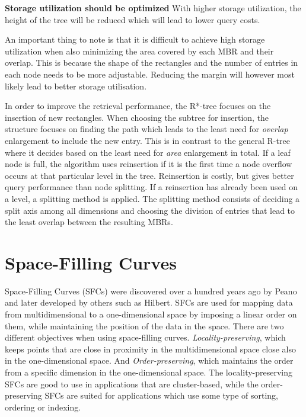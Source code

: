 \noindent
\textbf{Storage utilization should be optimized}\newline
With higher storage utilization, the height of the tree will be reduced which will lead to lower query costs. \newline

\noindent
An important thing to note is that it is difficult to achieve high storage utilization when also minimizing the area covered by each MBR and their overlap. This is because the shape of the rectangles and the number of entries in each node needs to be more adjustable. Reducing the margin will however most likely lead to better storage utilisation. \newline

\noindent
In order to improve the retrieval performance, the R*-tree focuses on the insertion of new rectangles. When choosing the subtree for insertion, the structure focuses on finding the path which leads to the least need for \emph{overlap} enlargement to include the new entry. This is in contrast to the general R-tree where it decides based on the least need for \emph{area} enlargement in total. If a leaf node is full, the algorithm uses reinsertion if it is the first time a node overflow occurs at that particular level in the tree. Reinsertion is costly, but gives better query performance than node splitting. If a reinsertion has already been used on a level, a splitting method is applied. The splitting method consists of deciding a split axis among all dimensions and choosing the division of entries that lead to the least overlap between the resulting MBRs.

\section{Space-Filling Curves}
Space-Filling Curves (SFCs) were discovered over a hundred years ago by Peano\cite{peano} and  later developed by others such as Hilbert\cite{hilbert}. SFCs are used for mapping data from multidimensional to a one-dimensional space by imposing a linear order on them, while maintaining the position of the data in the space. There are two different objectives when using space-filling curves\cite{IrregularSpace}. \emph{Locality-preserving}, which keeps points that are close in proximity in the multidimensional space close also in the one-dimensional space. And \emph{Order-preserving}, which maintains the order from a specific dimension in the one-dimensional space. The locality-preserving SFCs are good to use in applications that are cluster-based, while the order-preserving SFCs are suited for applications which use some type of sorting, ordering or indexing. \newline

